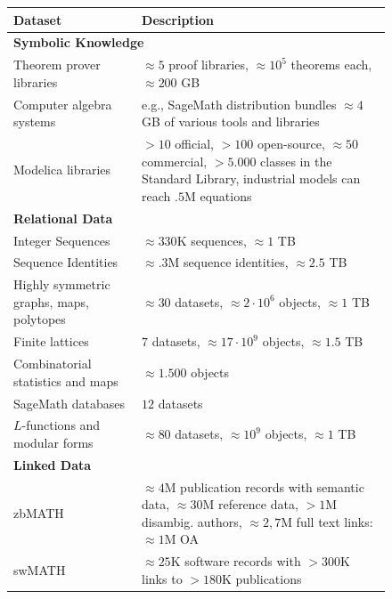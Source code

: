 \begin{figure}[htp]\centering\small{}
  \begin{tabular}{| p{} | p{}|}\hline
  Dataset & Description \\\hline\hline
  \multicolumn{2}{|l|}{\textbf{Symbolic Knowledge}} \\\hline
  Theorem prover libraries \cite{OAFproject:on}  & $\approx 5$ proof libraries, $\approx 10^5$ theorems each, $\approx 200$ GB \\\hline
  Computer algebra systems \cite{sagemath} & e.g., SageMath distribution bundles $\approx 4$ GB of various tools and libraries\\\hline
  Modelica libraries \cite{Modelica:on} &$> 10$ official, $> 100$ open-source, $\approx 50$ commercial,
      $> 5.000$ classes in the Standard Library, industrial models can reach $.5$M equations \\\hline
  \multicolumn{2}{|l|}{\textbf{Relational Data}} \\\hline
 Integer Sequences \cite{OEIS:on} & $\approx 330$K sequences, $\approx 1$ TB  \\\hline
 Sequence Identities \cite{kwarc:datahost:on} & $\approx .3$M sequence identities, $\approx 2.5$ TB \\\hline
 Highly symmetric graphs, maps, polytopes \cite{ConderCensuses:on, HartleyPolytopes:on, LeemansPolytopes:on, PotocnikCensuses:on, RoyleVT:on, WilsonET:on} & $\approx 30$ datasets, $\approx 2\cdot10^6$ objects, $\approx 1$ TB \\\hline
  Finite lattices \cite{KohLat:on, LeeLat:on, MalLat:on} & $7$ datasets, $\approx 17 \cdot 10^9$ objects, $\approx 1.5$ TB \\\hline
  Combinatorial statistics and maps \cite{findstat} & $\approx1.500$ objects \\\hline
  SageMath databases \cite{SageDB:on} & $12$ datasets \\\hline
  $L$-functions and modular forms \cite{lmfdb:on} & $\approx 80$ datasets, $\approx 10^9$ objects, $\approx 1$ TB \\\hline
  \multicolumn{2}{|l|}{\textbf{Linked Data}} \\\hline
   zbMATH \cite{zbMATH:on} & $\approx 4$M publication records with semantic data, $\approx 30$M reference data, $>1$M disambig. authors, $\approx 2,7$M full text links: $\approx 1$M OA \\\hline
  swMATH \cite{swMATH:on} & $\approx 25$K software records with $> 300$K links to $> 180$K publications \\\hline

\end{tabular}
\end{figure}
